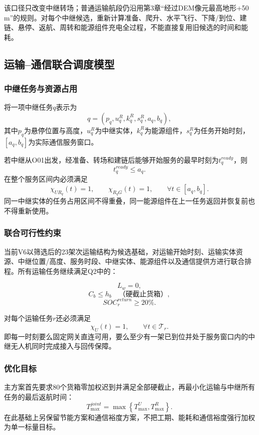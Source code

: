\documentclass[UTF8,a4paper,12pt]{ctexart}
\begin{document}
该口径只改变中继转场；普通运输航段仍沿用第3章“经过DEM像元最高地形+50 m”的规则。对每个中继候选，重新计算准备、爬升、水平飞行、下降/到位、建链、悬停、返航、周转和能源组件充电全过程，不能直接复用旧候选的时间和能耗。

\subsection{运输--通信联合调度模型}

\subsubsection{中继任务与资源占用}

将一项中继任务$q$表示为
\[
q=(p_q,u_q^R,k_q^R,s_q^R,a_q,b_q),
\]
其中$p_q$为悬停位置与高度，$u_q^R$为中继实体，$k_q^R$为能源组件，$s_q^R$为任务开始时刻，$[a_q,b_q]$为实际通信服务窗口。

若中继从O01出发，经准备、转场和建链后能够开始服务的最早时刻为$t_q^{ready}$，则
\[
t_q^{ready}\le a_q.
\]
在整个服务区间内必须满足
\[
\chi_{UR_q}(t)=1,\qquad
\chi_{R_qG}(t)=1,
\qquad
\forall t\in[a_q,b_q].
\]
同一中继实体的任务占用区间不得重叠，同一能源组件在上一任务返回并恢复前也不得重新使用。

\subsubsection{联合可行性约束}

当前V6以筛选后的23架次运输结构为候选基础，对运输开始时刻、运输实体资源、中继位置/高度、服务时段、中继实体、能源组件以及通信提供方进行联合排程。所有运输任务继续满足Q2中的：

\[
L_w=0,
\]
\[
C_b\le h_b\quad\text{（硬截止货箱）},
\]
\[
SOC_r^{return}\ge20\%.
\]

对每个运输任务$r$还必须满足
\[
\chi_U(t)=1,\qquad
\forall t\in\mathcal T_r.
\]
即每一时刻要么固定网关直连可用，要么至少有一架已到位并处于服务窗口内的中继无人机同时完成接入与回传保障。

\subsubsection{优化目标}

主方案首先要求80个货箱零加权迟到并满足全部硬截止，再最小化运输与中继所有任务的最后返航时间：
\[
\boxed{
T_{\max}^{joint}
=
\max
\left\{
T_{\max}^{U},
T_{\max}^{R}
\right\}.
}
\]
在此基础上另保留节能方案和通信裕度方案，不把工期、能耗和通信裕度强行加权为单一标量目标。
\end{document}
